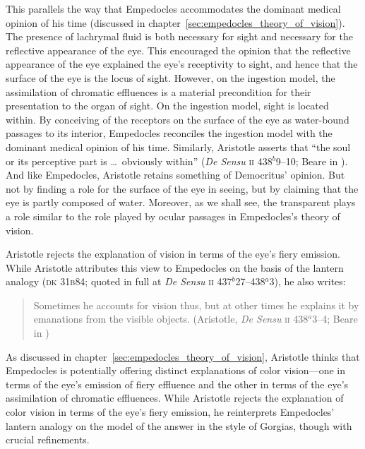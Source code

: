 This parallels the way that Empedocles accommodates the dominant medical opinion of his time (discussed in chapter~\ref{sec:empedocles_theory_of_vision}). The presence of lachrymal fluid is both necessary for sight and necessary for the reflective appearance of the eye. This encouraged the opinion that the reflective appearance of the eye explained the eye's receptivity to sight, and hence that the surface of the eye is the locus of sight. However, on the ingestion model, the assimilation of chromatic effluences is a material precondition for their presentation to the organ of sight. On the ingestion model, sight is located within. By conceiving of the receptors on the surface of the eye as water-bound passages to its interior, Empedocles reconciles the ingestion model with the dominant medical opinion of his time. Similarly, Aristotle asserts that ``the soul or its perceptive part is \ldots\ obviously within'' (\emph{De Sensu} \textsc{ii} 438\( ^{b} \)9--10; Beare in \citealt[6]{Barnes:1984uq}). And like Empedocles, Aristotle retains something of Democritus' opinion. But not by finding a role for the surface of the eye in seeing, but by claiming that the eye is partly composed of water. Moreover, as we shall see, the transparent plays a role similar to the role played by ocular passages in Empedocles's theory of vision.

Aristotle rejects the explanation of vision in terms of the eye's fiery emission. While Aristotle attributes this view to Empedocles on the basis of the lantern analogy (\textsc{dk} 31\textsc{b}84; quoted in full at \emph{De Sensu} \textsc{ii} 437\( ^{b} \)27--438\( ^{a} \)3), he also writes:
\begin{quote}
	Sometimes he accounts for vision thus, but at other times he explains it by emanations from the visible objects. (Aristotle, \emph{De Sensu} \textsc{ii} 438\( ^{a} \)3--4; Beare in \citealt[5]{Barnes:1984uq})
\end{quote}
As discussed in chapter~\ref{sec:empedocles_theory_of_vision}, Aristotle thinks that Empedocles is potentially offering distinct explanations of color vision---one in terms of the eye's emission of fiery effluence and the other in terms of the eye's assimilation of chromatic effluences. While Aristotle rejects the explanation of color vision in terms of the eye's fiery emission, he reinterprets Empedocles' lantern analogy on the model of the answer in the style of Gorgias, though with crucial refinements.

